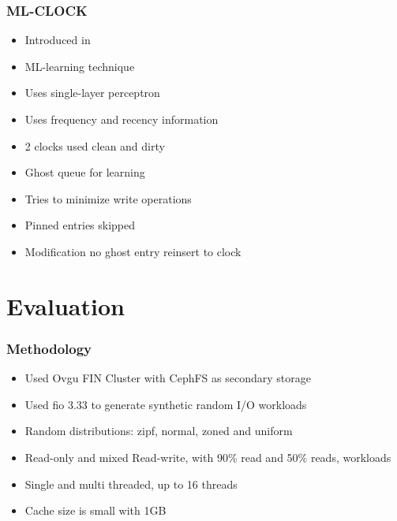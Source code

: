 \documentclass[
	aspectratio=169,
	compress,
]{beamer}
\newcommand{\navframetitle}[1]{\frametitle{#1\hfill{\footnotesize\lastsection{}}}}
\begin{document}
\begin{frame}
	\navframetitle{ML-CLOCK}

\begin{itemize}
	\item Introduced in \cite{cho2021ml}	
	\item ML-learning technique
	\item Uses single-layer perceptron
	\item Uses frequency and recency information
	\item 2 clocks used clean and dirty
	\item Ghost queue for learning 
	\item Tries to minimize write operations
	\item Pinned entries skipped
	\item Modification no ghost entry reinsert to clock
\end{itemize}	
\end{frame}

\section{Evaluation}
\label{sec:evaluation}

\begin{frame}[fragile]
	\navframetitle{Methodology}

	\begin{itemize}
		\item Used Ovgu FIN Cluster with CephFS as secondary storage
		\item Used fio 3.33 to generate synthetic random I/O workloads
		\item Random distributions: zipf, normal, zoned and uniform
		\item Read-only and mixed Read-write, with 90\% read and 50\% reads, workloads
		\item Single and multi threaded, up to 16 threads
		\item Cache size is small with 1GB
 	\end{itemize}
\end{frame}
\end{document}

